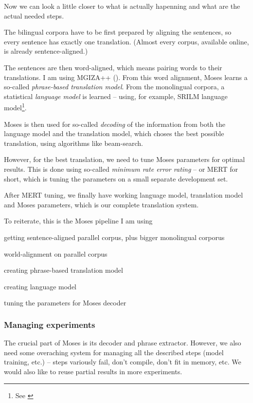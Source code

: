 Now we can look a little closer to what is actually hapenning and what are the actual needed steps.

The bilingual corpora have to be first prepared by aligning the sentences, so every sentence has exactly one translation. (Almost every corpus, available online, is already sentence-aligned.)

The sentences are then word-aligned, which means pairing words to their translations. I am using MGIZA++ (\cite{mgiza}). From this word alignment, Moses learns a so-called \emph{phrase-based translation model}. From the monolingual corpora, a statistical \emph{language model} is learned -- using, for example, SRILM language model\footnote{See \cite{srilm}}.

Moses is then used for so-called \emph{decoding} of the information from both the language model and the translation model, which choses the best possible translation, using algorithms like beam-search.

However, for the best translation, we need to tune Moses parameters for optimal results. This is done using so-called \emph{minimum rate error rating} -- or MERT for short, which is tuning the parameters on a small separate development set.



After MERT tuning, we finally have working language model, translation model and Moses parameters, which is our complete translation system.

To reiterate, this is the  Moses pipeline I am using
\begin{pitemize}
\item getting sentence-aligned parallel corpus, plus bigger monolingual corporus
\item world-alignment on parallel corpus
\item creating phrase-based translation model
\item creating language model
\item tuning the parameters for Moses decoder
\end{pitemize}


\subsubsection{Managing experiments}
The crucial part of Moses is its decoder and phrase extractor. However, we also need some overaching system for managing all the described steps (model training, etc.) -- steps variously fail, don't compile, don't fit in memory, etc. We would also like to reuse partial results in more experiments.

